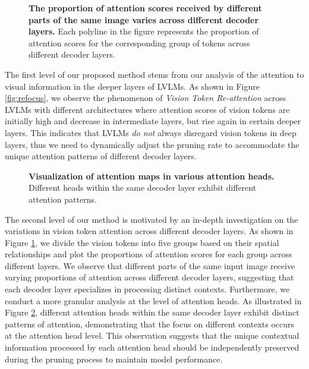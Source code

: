 \begin{figure}[h!]
	\centering
	\caption{\textbf{The proportion of attention scores received by different parts of the same image varies across different decoder layers.} Each polyline in the figure represents the proportion of attention scores for the corresponding group of tokens across different decoder layers.}
        \vspace{-0.2cm}
		\label{fig:image-part}
\end{figure}

The first level of our proposed method stems from our analysis of the attention to visual information in the deeper layers of LVLMs. As shown in Figure \ref{fig:refocus}, we observe the phenomenon of \textit{Vision Token Re-attention} across LVLMs with different architectures where attention scores of vision tokens are initially high and decrease in intermediate layers, but rise again in certain deeper layers. This indicates that LVLMs \textit{do not} always disregard vision tokens in deep layers, thus we need to dynamically adjust the pruning rate to accommodate the unique attention patterns of different decoder layers.

\begin{figure}[h!]
	\centering
	\caption{\textbf{Visualization of attention maps in various attention heads.} Different heads within the same decoder layer exhibit different attention patterns.}
        \vspace{-0.2cm}
		\label{fig:per-head-attention-pattern}
\end{figure}

The second level of our method is motivated by an in-depth investigation on the variations in vision token attention across different decoder layers. As shown in Figure \ref{fig:image-part}, we divide the vision tokens into five groups based on their spatial relationships and plot the proportions of attention scores for each group across different layers. We observe that different parts of the same input image receive varying proportions of attention across different decoder layers, suggesting that each decoder layer specializes in processing distinct contexts. Furthermore, we conduct a more granular analysis at the level of attention heads. As illustrated in Figure \ref{fig:per-head-attention-pattern}, different attention heads within the same decoder layer exhibit distinct patterns of attention, demonstrating that the focus on different contexts occurs at the attention head level. This observation suggests that the unique contextual information processed by each attention head should be independently preserved during the pruning process to maintain model performance.

